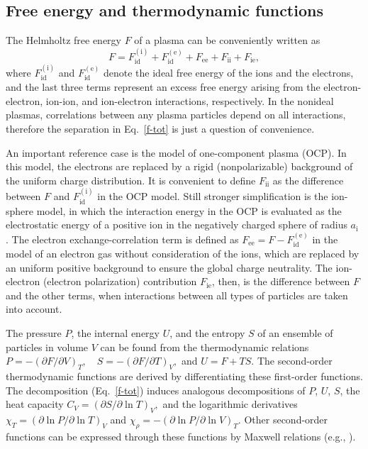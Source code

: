 \documentclass[traditabstract]{aa}
\newcommand{\beq}{\begin{equation}}
\newcommand{\eeq}{\end{equation}}
\newcommand{\req}[1]{Eq.~\ref{#1}}
\newcommand{\aion}{a_\mathrm{i}}
\begin{document}
\subsection{Free energy and thermodynamic functions}

The Helmholtz free energy $F$ of a plasma
can be conveniently written as
\beq
   F = 
   F_\mathrm{id}^\mathrm{(i)} + F_\mathrm{id}^\mathrm{(e)} 
   + F_\mathrm{ee} + F_\mathrm{ii} + F_\mathrm{ie}, 
\label{f-tot}
\eeq
where $F_\mathrm{id}^\mathrm{(i)}$ and
$F_\mathrm{id}^\mathrm{(e)}$  denote the ideal free energy
of the ions and the electrons, and the last three terms
represent an excess free energy arising from  the
electron-electron, ion-ion, and ion-electron interactions,
respectively. In the nonideal plasmas, correlations between
any plasma particles depend on all interactions, therefore
the separation in \req{f-tot} is just a question of
convenience.

An important reference case is the model of one-component
plasma (OCP). In this model, the electrons are replaced by a
rigid (nonpolarizable) background of the uniform charge
distribution. It is convenient to define $F_\mathrm{ii}$ as
the difference between $F$ and $F_\mathrm{id}^\mathrm{(i)}$
in the OCP model. Still stronger simplification is the
ion-sphere model, in which the interaction energy in the OCP
is evaluated as the electrostatic energy of a positive ion
in the negatively charged sphere of radius $\aion$
\citep{Salpeter61}. The electron exchange-correlation term
is defined as  $F_\mathrm{ee}=F-F_\mathrm{id}^\mathrm{(e)}$
in the model of an electron gas without consideration of the
ions, which are replaced by an uniform positive background
to ensure the global charge neutrality. The
ion-electron (electron polarization) contribution
$F_\mathrm{ie}$, then, is the difference between $F$ and the other
terms, when interactions between all types of particles are
taken into account.

The pressure $P$, the internal energy $U$, and the entropy
$S$ of an ensemble of particles in volume $V$ can be
found from the thermodynamic relations
$
   P=-(\partial F/\partial V)_T, \quad
   S= -(\partial F / \partial T )_V,
$
and $U=F+TS$.
The second-order thermodynamic functions are derived by
differentiating these first-order functions. The
decomposition (\req{f-tot}) induces analogous decompositions
of $P$, $U$, $S$, the heat capacity
$C_V=(\partial S/\partial\ln T)_V,$ and
the logarithmic derivatives
$
   \chi_T=(\partial\ln P/\partial\ln T)_V
$ 
and
$
   \chi_\rho=-(\partial\ln P/\partial\ln V)_T.
$
Other second-order functions can be expressed through these
functions by Maxwell relations (e.g., \citealp{LaLi-SP1}).
\end{document}
